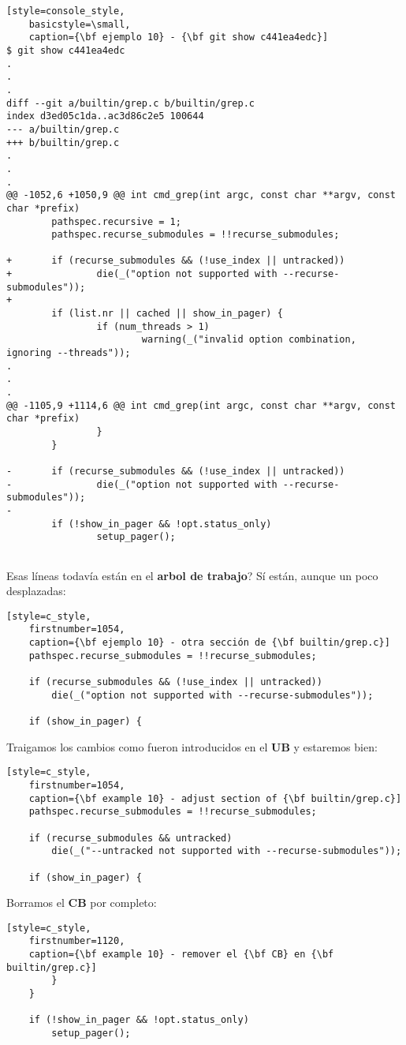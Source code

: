 \begin{lstlisting}[style=console_style,
	basicstyle=\small,
	caption={\bf ejemplo 10} - {\bf git show c441ea4edc}]
$ git show c441ea4edc
.
.
.
diff --git a/builtin/grep.c b/builtin/grep.c
index d3ed05c1da..ac3d86c2e5 100644
--- a/builtin/grep.c
+++ b/builtin/grep.c
.
.
.
@@ -1052,6 +1050,9 @@ int cmd_grep(int argc, const char **argv, const char *prefix)
        pathspec.recursive = 1;
        pathspec.recurse_submodules = !!recurse_submodules;
 
+       if (recurse_submodules && (!use_index || untracked))
+               die(_("option not supported with --recurse-submodules"));
+
        if (list.nr || cached || show_in_pager) {
                if (num_threads > 1)
                        warning(_("invalid option combination, ignoring --threads"));
.
.
.
@@ -1105,9 +1114,6 @@ int cmd_grep(int argc, const char **argv, const char *prefix)
                }
        }
 
-       if (recurse_submodules && (!use_index || untracked))
-               die(_("option not supported with --recurse-submodules"));
-
        if (!show_in_pager && !opt.status_only)
                setup_pager();
 
\end{lstlisting}

Esas líneas todavía están en el {\bf arbol de trabajo}? Sí están, aunque un poco desplazadas:
\begin{lstlisting}[style=c_style,
	firstnumber=1054,
	caption={\bf ejemplo 10} - otra sección de {\bf builtin/grep.c}]
	pathspec.recurse_submodules = !!recurse_submodules;

	if (recurse_submodules && (!use_index || untracked))
		die(_("option not supported with --recurse-submodules"));

	if (show_in_pager) {
\end{lstlisting}

Traigamos los cambios como fueron introducidos en el {\bf UB} y estaremos bien:
\begin{lstlisting}[style=c_style,
	firstnumber=1054,
	caption={\bf example 10} - adjust section of {\bf builtin/grep.c}]
	pathspec.recurse_submodules = !!recurse_submodules;

	if (recurse_submodules && untracked)
		die(_("--untracked not supported with --recurse-submodules"));

	if (show_in_pager) {
\end{lstlisting}


Borramos el {\bf CB} por completo:
\begin{lstlisting}[style=c_style,
	firstnumber=1120,
	caption={\bf example 10} - remover el {\bf CB} en {\bf builtin/grep.c}]
		}
	}

	if (!show_in_pager && !opt.status_only)
		setup_pager();
\end{lstlisting}

